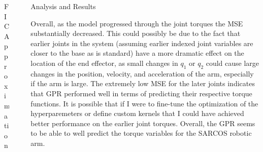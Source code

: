 \documentclass[final]{beamer}
\newlength{\sepwid}
\newlength{\onecolwid}
\newlength{\twocolwid}
\begin{document}
\begin{frame}[t]
\begin{columns}[t]
\begin{column}{\twocolwid}
\begin{columns}[t,totalwidth=\twocolwid]
\begin{column}{\onecolwid}
\begin{block}{FIC Approximation}
\end{block}


\end{column} %

\end{columns} %


\begin{columns}[t,totalwidth=\twocolwid] %

\begin{column}{\onecolwid} %


\end{column} %

\end{columns} %

\end{column} %

\begin{column}{\sepwid}\end{column} %

\begin{column}{\onecolwid} %


\begin{block}{Analysis and Results}

    Overall, as the model progressed through the joint torques the MSE substantially decreased.
    This could possibly be due to the fact that earlier joints in the system (assuming earlier
    indexed joint variables are closer to the base as is standard) have a more dramatic effect
    on the location of the end effector, as small changes in $q_{1}$ or $q_{2}$ could cause large
    changes in the position, velocity, and acceleration of the arm, especially if the arm is
    large. The extremely low MSE for the later joints indicates that GPR performed well in terms
    of predicting their respective torque functions. It is possible that if I were to
    fine-tune the optimization of the hyperparemeters or define custom kernels
    that I could have achieved better performance on the earlier joint torques. Overall, the GPR
    seems to be able to well predict the torque variables for the SARCOS robotic arm.


\end{block}
\end{column}
\end{columns}
\end{frame}
\end{document}
